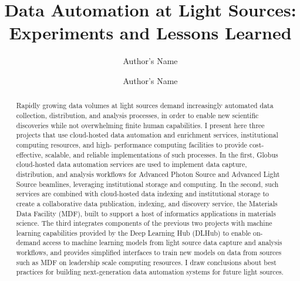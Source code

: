 \documentclass{aip-cp}
\begin{document}
\title{Data Automation at Light Sources:\\Experiments and Lessons Learned}

\author[aff1,aff2]{Author's Name}
\author[aff2]{Author's Name}


\maketitle


\begin{abstract}
Rapidly growing data volumes at light sources demand increasingly automated data collection, distribution, and analysis processes, in order to enable new scientific discoveries while not overwhelming finite human capabilities. I present here three projects that use cloud-hosted data automation and enrichment services, institutional computing resources, and high- performance computing facilities to provide cost-effective, scalable, and reliable implementations of such processes. In the first, Globus cloud-hosted data automation services are used to implement data capture, distribution, and analysis workflows for Advanced Photon Source and Advanced Light Source beamlines, leveraging institutional storage and computing. In the second, such services are combined with cloud-hosted data indexing and institutional storage to create a collaborative data publication, indexing, and discovery service, the Materials Data Facility (MDF), built to support a host of informatics applications in materials science. The third integrates components of the previous two projects with machine learning capabilities provided by the Deep Learning Hub (DLHub) to enable on-demand access to machine learning models from light source data capture and analysis workflows, and provides simplified interfaces to train new models on data from sources such as MDF on leadership scale computing resources. I draw conclusions about best practices for building next-generation data automation systems for future light sources.
\end{abstract}
\end{document}
